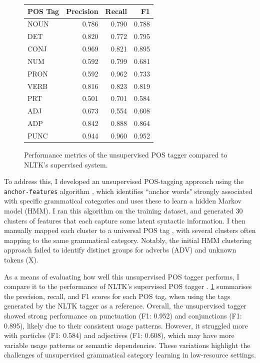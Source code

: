 \begin{figure}
    \centering
    \small
    \begin{tabular}{lrrr}
    \toprule
    POS Tag & Precision & Recall & F1 \\
    \midrule
    NOUN & 0.786 & 0.790 & 0.788 \\
    DET & 0.820 & 0.772 & 0.795 \\
    CONJ & 0.969 & 0.821 & 0.895 \\
    NUM & 0.592 & 0.799 & 0.681 \\
    PRON & 0.592 & 0.962 & 0.733 \\   
    VERB & 0.816 & 0.823 & 0.819 \\
    PRT & 0.501 & 0.701 & 0.584 \\
    ADJ & 0.673 & 0.554 & 0.608 \\
    ADP & 0.842 & 0.888 & 0.864 \\
    PUNC & 0.944 & 0.960 & 0.952 \\
    \bottomrule
    \end{tabular}
    \caption{\label{tbl:unsupervised-pos-performance} Performance metrics of the unsupervised POS tagger compared to NLTK's supervised system.}
    \label{fig:unsupervised-pos-performance}
\end{figure}

To address this, I developed an unsupervised POS-tagging approach using the \texttt{anchor-features} algorithm \citep{stratos2016unsupervisedpos}, which identifies ``anchor words" strongly associated with specific grammatical categories and uses these to learn a hidden Markov model (HMM). I ran this algorithm on the training dataset, and generated 30 clusters of features that each capture some latent syntactic information. I then manually mapped each cluster to a universal POS tag \citep{petrov2012universalpos}, with several clusters often mapping to the same grammatical category. Notably, the initial HMM clustering approach failed to identify distinct groups for adverbs (ADV) and unknown tokens (X). 

As a means of evaluating how well this unsupervised POS tagger performs, I compare it to the performance of NLTK's supervised POS tagger \citep{bird2009natural}. \cref{fig:unsupervised-pos-performance} summarises the precision, recall, and F1 scores for each POS tag, when using the tags generated by the NLTK tagger as a reference. Overall, the unsupervised tagger showed strong performance on punctuation (F1: 0.952) and conjunctions (F1: 0.895), likely due to their consistent usage patterns. However, it struggled more with particles (F1: 0.584) and adjectives (F1: 0.608), which may have more variable usage patterns or semantic dependencies. These variations highlight the challenges of unsupervised grammatical category learning in low-resource settings.

